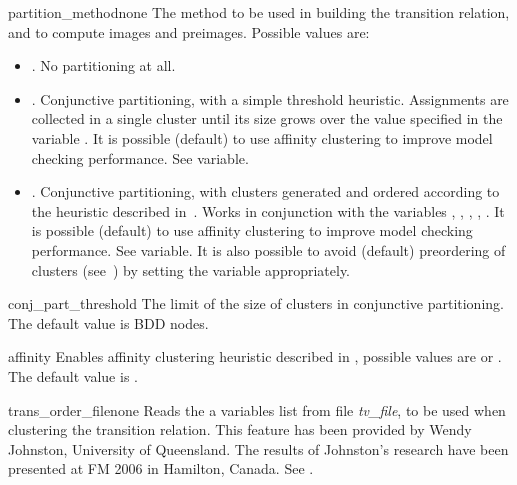 \label{build::model}


\begin{nusmvVar} {partition\_method}{}{none}
The method to be used in building the transition relation, and to
compute images and preimages. Possible values are:

\begin{itemize}
\item {}. No partitioning at all.

\item {}. Conjunctive partitioning, with a simple
threshold heuristic. Assignments are collected in a single cluster
until its size grows over the value specified in the variable
. It is possible (default) to use affinity
clustering to improve model checking performance. See
 variable.

\item {}. Conjunctive partitioning, with clusters 
generated and ordered according to the heuristic described
in~\cite{RAP+95}. Works in conjunction with the variables
,
, , , .
It is possible (default) to use affinity clustering to improve model 
checking performance. See  variable. It is also possible
to avoid (default) preordering of clusters (see~\cite{RAP+95}) by
setting the  variable appropriately.
\end{itemize}

\end{nusmvVar}

\begin{nusmvVar}{conj\_part\_threshold}{}{}
The limit of the size of clusters in conjunctive partitioning. The
default value is  BDD nodes.
\end{nusmvVar}

\begin{nusmvVar} {affinity}{}{}
Enables affinity clustering heuristic described in \cite{MOON00},
possible values are  or . The default value is .
\end{nusmvVar}

\begin{nusmvVar} {trans\_order\_file}{}{none}
Reads the a variables list from file {\it tv\_file}, to be used when
clustering the transition relation.  This feature has been provided by
Wendy Johnston, University of Queensland. The results of Johnston's
research have been presented at FM 2006 in Hamilton, Canada. See
\cite{fm06}.
\end{nusmvVar}

